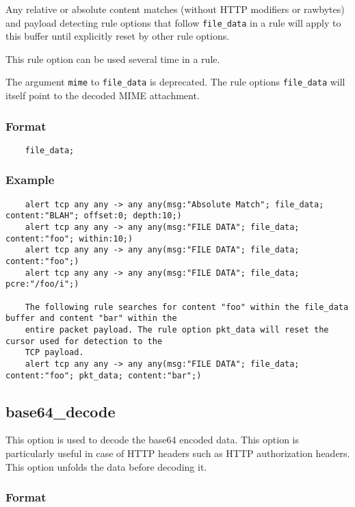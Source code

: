 \documentclass[english]{report}
\begin{document}
Any relative or absolute content matches (without HTTP modifiers or rawbytes) and payload detecting
rule options that follow \texttt{file\_data} in a rule will apply to this buffer until explicitly reset 
by other rule options.

This rule option can be used several time in a rule. 

The argument \texttt{mime} to \texttt{file\_data} is deprecated. The rule options \texttt{file\_data} will 
itself point to the decoded MIME attachment.

\subsubsection{Format}

\begin{verbatim}
	file_data;
\end{verbatim}

\subsubsection{Example}

\begin{verbatim}
	alert tcp any any -> any any(msg:"Absolute Match"; file_data; content:"BLAH"; offset:0; depth:10;)
	alert tcp any any -> any any(msg:"FILE DATA"; file_data; content:"foo"; within:10;)
	alert tcp any any -> any any(msg:"FILE DATA"; file_data; content:"foo";)
	alert tcp any any -> any any(msg:"FILE DATA"; file_data; pcre:"/foo/i";)
	
	The following rule searches for content "foo" within the file_data buffer and content "bar" within the 
	entire packet payload. The rule option pkt_data will reset the cursor used for detection to the 
	TCP payload.
	alert tcp any any -> any any(msg:"FILE DATA"; file_data; content:"foo"; pkt_data; content:"bar";)

\end{verbatim}


\subsection{base64\_decode}
\label{sub:base64_decode}

This option is used to decode the base64 encoded data. This option is particularly useful
in case of HTTP headers such as HTTP authorization headers. This option unfolds the data
before decoding it.

\subsubsection{Format}
\end{document}
